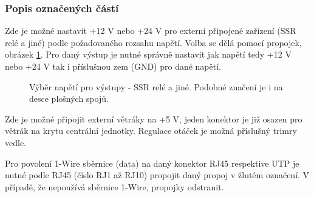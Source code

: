 
\begin{Czech}
\subsubsection{Popis označených částí}
\end{Czech}

\begin{Czech}
\end{Czech}

\begin{Czech}
Zde je možné nastavit +12 V nebo +24 V pro externí připojené zařízení (SSR relé a jiné) podle požadovaného rozsahu napětí. Volba se dělá pomocí propojek, obrázek \ref{fig:pin-header-relays}. Pro daný výstup je nutné správně nastavit jak napětí tedy +12 V nebo +24 V tak i příslušnou zem (GND) pro dané napětí.
\end{Czech}

\begin{Czech}
\begin{figure}[H]
    \centering
    \def\svgwidth{0.25\columnwidth}
    \graphicspath{{pictures/all/hardware/svg/}}
    
    \caption{Výběr napětí pro výstupy - SSR relé a jiné. Podobné značení je i na desce plošných spojů.}
    \label{fig:pin-header-relays}
\end{figure}
\end{Czech}

\begin{Czech}
\end{Czech}

\begin{Czech}
Zde je možné připojit externí větráky na +5 V, jeden konektor je již osazen pro větrák na krytu centrální jednotky. Regulace otáček je možná příslušný trimry vedle.
\end{Czech}

\begin{Czech}
\end{Czech}

\begin{Czech}
Pro povolení 1-Wire sběrnice (data) na daný konektor RJ45 respektive UTP je nutné podle RJ45 (číslo RJ1 až RJ10) propojit daný propoj v žlutém označení. V případě, že nepoužívá sběrnice 1-Wire, propojky odstranit.
\end{Czech}

